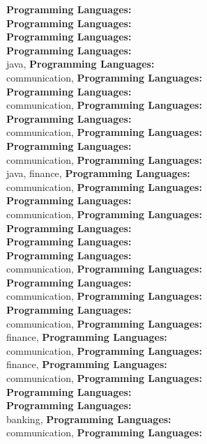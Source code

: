 \textbf{Programming Languages:} \\
\textbf{Programming Languages:} \\
\textbf{Programming Languages:} \\
\textbf{Programming Languages:} \\
java, \textbf{Programming Languages:} \\
communication, \textbf{Programming Languages:} \\
\textbf{Programming Languages:} \\
communication, \textbf{Programming Languages:} \\
\textbf{Programming Languages:} \\
communication, \textbf{Programming Languages:} \\
\textbf{Programming Languages:} \\
communication, \textbf{Programming Languages:} \\
java, finance, \textbf{Programming Languages:} \\
communication, \textbf{Programming Languages:} \\
\textbf{Programming Languages:} \\
communication, \textbf{Programming Languages:} \\
\textbf{Programming Languages:} \\
\textbf{Programming Languages:} \\
\textbf{Programming Languages:} \\
communication, \textbf{Programming Languages:} \\
\textbf{Programming Languages:} \\
communication, \textbf{Programming Languages:} \\
\textbf{Programming Languages:} \\
communication, \textbf{Programming Languages:} \\
finance, \textbf{Programming Languages:} \\
communication, \textbf{Programming Languages:} \\
finance, \textbf{Programming Languages:} \\
communication, \textbf{Programming Languages:} \\
\textbf{Programming Languages:} \\
\textbf{Programming Languages:} \\
banking, \textbf{Programming Languages:} \\
communication, \textbf{Programming Languages:} \\
